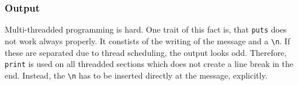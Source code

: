 \documentclass{scrartcl}
\begin{document}
\subsubsection{Output}
\label{output-pitfalls}
Multi-threadded programming is hard. One trait of this fact is, that \texttt{puts} does not work always properly. It constists of the writing of the message and a \texttt{\textbackslash n}. If these are separated due to thread scheduling, the output looks odd. Therefore, \texttt{print} is used on all threadded sections which does not create a line break in the end. Instead, the \texttt{\textbackslash n} has to be inserted directly at the message, explicitly.
\end{document}
